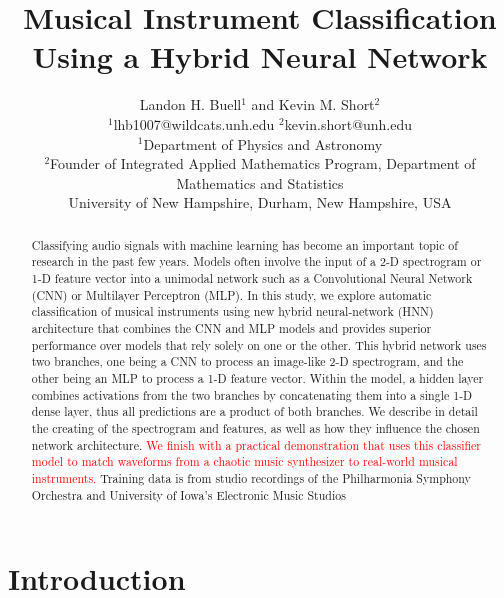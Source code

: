 \documentclass[conference,onecolumn,letterpaper]{IEEEtran}
\title{Musical Instrument Classification Using a Hybrid Neural Network}
\author{Landon H. Buell$^1$ 				and Kevin M. Short$^2$\\
        $^1$lhb1007@wildcats.unh.edu  		$^2$kevin.short@unh.edu\\
        $^1$Department of Physics and Astronomy\\
        $^2$Founder of Integrated Applied Mathematics Program, Department of Mathematics and Statistics\\
        University of New Hampshire, Durham, New Hampshire, USA\\
       }
\begin{document}
\maketitle


\begin{abstract}
    Classifying audio signals with machine learning has become an important topic of research in the past few years. Models often involve the input of a 2-D spectrogram or 1-D feature vector into a unimodal network such as a Convolutional Neural Network (CNN) or Multilayer Perceptron (MLP). In this study, we explore automatic classification of musical instruments using new hybrid neural-network (HNN)  architecture that combines the CNN and MLP models and provides superior performance over models that rely solely on one or the other. This hybrid network uses two branches, one being a CNN to process an image-like 2-D spectrogram, and the other being an MLP to process a 1-D feature vector. Within the model, a hidden layer combines activations from the two branches by concatenating them into a single 1-D dense layer, thus all predictions are a product of both branches. We describe in detail the creating of the spectrogram and features, as well as how they influence the chosen network architecture. \textcolor{red}{We finish with a practical demonstration that uses this classifier model to match waveforms from a chaotic music synthesizer to real-world musical instruments.} Training data is from studio recordings of the Philharmonia Symphony Orchestra and University of Iowa's Electronic Music Studios
\end{abstract}


\section{Introduction}
\label{sec:Intro}

\end{document}
